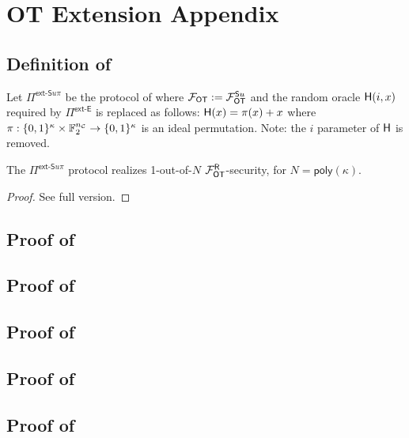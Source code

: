 
\section{OT Extension Appendix}\label{sec:extApp}


\iffullversion
\else

\subsection{Definition of }

\begin{definition}\label{def:ext_S_R}
	Let $\Pi^{\textsf{ext-S}u\pi}$ be the protocol of  where $\mathcal{F}_{\mathsf{OT}}:=\mathcal{F}_{\mathsf{OT}}^{\mathsf{S} u}$ and the random oracle $\mathsf{H}(i,x)$ required by $\Pi^{\textsf{ext-E}}$ is replaced as follows: $\mathsf{H}(x)=\pi(x)+x$ where $\pi:\{0,1\}^{\kappa} \times \mathbb{F}^{{n_\mathcal{C}}}_2 \rightarrow\{0,1\}^\kappa$ is an ideal permutation. Note: the $i$ parameter of $\mathsf{H}$ is removed.
\end{definition}
\begin{lemma}\label{lem:ext_S_R}
	The $\Pi^{\textsf{ext-S}u\pi}$ protocol realizes 1-out-of-$N$ $\mathcal{F}_{\mathsf{OT}}^\mathsf{R}$-security, for $N=\textsf{poly}(\kappa)$.
\end{lemma}
\begin{proof}
	See full version.
\end{proof}


\subsection{Proof of }



\subsection{Proof of }



\subsection{Proof of }



\subsection{Proof of }



\subsection{Proof of }

\fi